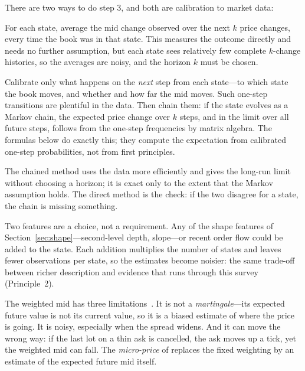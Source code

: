 There are two ways to do step 3, and both are calibration to market data:
\begin{description}[leftmargin=1.5em,style=nextline,itemsep=2pt]
\item[Direct] For each state, average the mid change observed over the next $k$ price changes, every
  time the book was in that state. This measures the outcome directly and needs no further
  assumption, but each state sees relatively few complete $k$-change histories, so the averages are
  noisy, and the horizon $k$ must be chosen.
\item[Chained (Stoikov)] Calibrate only what happens on the \emph{next} step from each state---to
  which state the book moves, and whether and how far the mid moves. Such one-step transitions are
  plentiful in the data. Then chain them: if the state evolves as a Markov chain, the expected price
  change over $k$ steps, and in the limit over all future steps, follows from the one-step frequencies
  by matrix algebra. The formulas below do exactly this; they compute the expectation from calibrated
  one-step probabilities, not from first principles.
\end{description}
The chained method uses the data more efficiently and gives the long-run limit without choosing a
horizon; it is exact only to the extent that the Markov assumption holds. The direct method is the check:
if the two disagree for a state, the chain is missing something.

Two features are a choice, not a requirement. Any of the shape features of
Section~\ref{sec:shape}---second-level depth, slope---or recent order flow could be added to the state.
Each addition multiplies the number of states and leaves fewer observations per state, so the estimates
become noisier: the same trade-off between richer description and evidence that runs through this
survey (Principle~2).


The weighted mid has three limitations~\citep{stoikov2018}. It is not a \emph{martingale}---its
expected future value is not its current value, so it is a biased estimate of where the price is
going. It is noisy, especially when the spread widens. And it can move the wrong way: if the last
lot on a thin ask is cancelled, the ask moves up a tick, yet the weighted mid can fall. The
\emph{micro-price} of \citet{stoikov2018} replaces the fixed weighting by an estimate of the
expected future mid itself.

